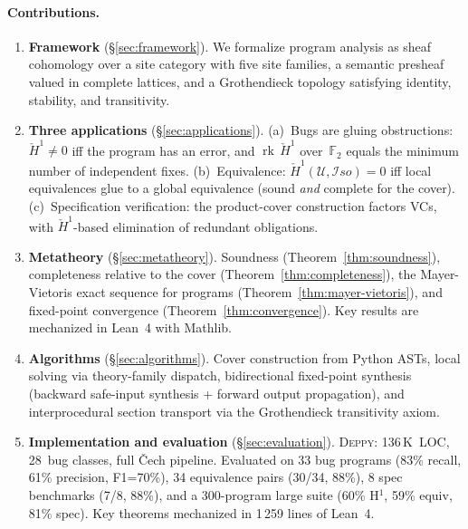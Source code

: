 \documentclass[acmsmall,screen,review,anonymous]{acmart}
\theoremstyle{remark}
\newcommand{\Hc}[1]{\check{H}^{#1}}
\newcommand{\Iso}{\mathcal{I}\mathit{so}}
\newcommand{\rk}{\operatorname{rk}}
\newcommand{\GF}{\mathbb{F}}
\begin{document}
\paragraph{Contributions.}
\begin{enumerate}[leftmargin=*,nosep]
\item \textbf{Framework} (\S\ref{sec:framework}).
  We formalize program analysis as sheaf cohomology over a site
  category with five site families, a semantic presheaf valued in
  complete lattices, and a Grothendieck topology satisfying identity,
  stability, and transitivity.

\item \textbf{Three applications} (\S\ref{sec:applications}).
  (a)~Bugs are gluing obstructions: $\Hc{1} \neq 0$ iff the program
  has an error, and $\rk\,\Hc{1}$ over~$\GF_2$ equals the minimum
  number of independent fixes.
  (b)~Equivalence: $\Hc{1}(\mathcal{U}, \Iso) = 0$ iff local
  equivalences glue to a global equivalence (sound \emph{and} complete
  for the cover).
  (c)~Specification verification: the product-cover construction
  factors VCs, with $\Hc{1}$-based elimination of redundant obligations.

\item \textbf{Metatheory} (\S\ref{sec:metatheory}).
  Soundness (Theorem~\ref{thm:soundness}), completeness relative to the
  cover (Theorem~\ref{thm:completeness}), the Mayer-Vietoris exact
  sequence for programs (Theorem~\ref{thm:mayer-vietoris}), and
  fixed-point convergence (Theorem~\ref{thm:convergence}).
  Key results are mechanized in Lean~4 with Mathlib.

\item \textbf{Algorithms} (\S\ref{sec:algorithms}).
  Cover construction from Python ASTs, local solving via theory-family
  dispatch, bidirectional fixed-point synthesis (backward safe-input
  synthesis + forward output propagation), and interprocedural section
  transport via the Grothendieck transitivity axiom.

\item \textbf{Implementation and evaluation} (\S\ref{sec:evaluation}).
  \textsc{Deppy}: 136\,K~LOC, 28~bug classes, full \v{C}ech pipeline.
  Evaluated on 33 bug programs (83\% recall, 61\% precision, F1=70\%),
  34 equivalence pairs (30/34, 88\%), 8 spec benchmarks (7/8, 88\%),
  and a 300-program large suite (60\% H$^1$, 59\% equiv, 81\% spec).
  Key theorems mechanized in 1\,259 lines of Lean~4.
\end{enumerate}
\end{document}
